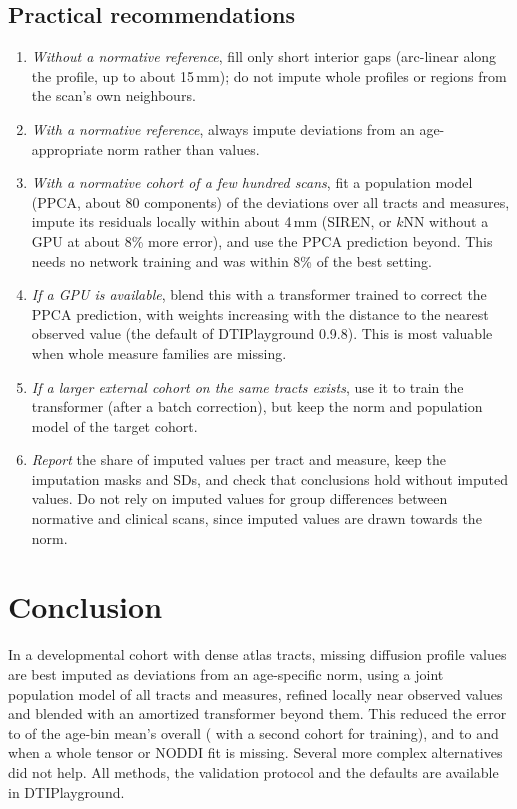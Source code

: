 \documentclass[11pt]{article}
\begin{document}
\subsection{Practical recommendations}

\begin{enumerate}
\item \emph{Without a normative reference}, fill only short interior gaps (arc-linear along the profile, up to about
15\,mm); do not impute whole profiles or regions from the scan's own neighbours.
\item \emph{With a normative reference}, always impute deviations from an age-appropriate norm rather than values.
\item \emph{With a normative cohort of a few hundred scans}, fit a population model (PPCA, about 80 components) of the
deviations over all tracts and measures, impute its residuals locally within about 4\,mm (SIREN, or $k$NN without a
GPU at about 8\% more error), and use the PPCA prediction beyond. This needs no network training and was within 8\% of
the best setting.
\item \emph{If a GPU is available}, blend this with a transformer trained to correct the PPCA prediction, with weights
increasing with the distance to the nearest observed value (the default of DTIPlayground 0.9.8). This is most valuable
when whole measure families are missing.
\item \emph{If a larger external cohort on the same tracts exists}, use it to train the transformer (after a batch
correction), but keep the norm and population model of the target cohort.
\item \emph{Report} the share of imputed values per tract and measure, keep the imputation masks and SDs, and check
that conclusions hold without imputed values. Do not rely on imputed values for group differences between normative
and clinical scans, since imputed values are drawn towards the norm.
\end{enumerate}

\section{Conclusion}

In a developmental cohort with dense atlas tracts, missing diffusion profile values are best imputed as deviations
from an age-specific norm, using a joint population model of all tracts and measures, refined locally near observed
values and blended with an amortized transformer beyond them. This reduced the error to \rFinal{} of the age-bin
mean's overall (\rRefFinal{} with a second cohort for training), and to \rFinalWdti{} and \rFinalWnoddi{} when a whole
tensor or NODDI fit is missing. Several more complex alternatives did not help. All methods, the validation protocol
and the defaults are available in DTIPlayground.
\end{document}
